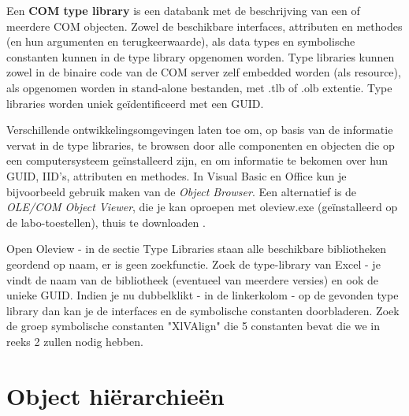 \documentclass[11pt,a4paper]{report}
\begin{document}
Een \textbf{COM type library} is een databank met de beschrijving van een of meerdere COM objecten. Zowel de beschikbare interfaces, attributen en methodes (en hun argumenten en terugkeerwaarde), als data types en symbolische constanten kunnen in de type library opgenomen worden. Type libraries kunnen zowel in de binaire code van de COM server zelf embedded worden (als resource), als opgenomen worden in stand-alone bestanden, met .tlb of .olb extentie. Type libraries worden uniek geïdentificeerd met een GUID.
\par Verschillende ontwikkelingsomgevingen laten toe om, op basis van de informatie vervat in de type libraries, te browsen door alle componenten en objecten die op een computersysteem geïnstalleerd zijn, en om informatie te bekomen over hun GUID, IID's, attributen en methodes. In Visual Basic en Office kun je bijvoorbeeld gebruik maken van de \textit{Object Browser}. Een alternatief is de \textit{OLE/COM Object Viewer}, die je kan oproepen met oleview.exe (geïnstalleerd op de labo-toestellen), thuis te downloaden .

\par Open Oleview - in de sectie Type Libraries staan alle beschikbare bibliotheken geordend op naam, er is geen zoekfunctie. Zoek de type-library van Excel - je vindt de naam van de bibliotheek (eventueel van meerdere versies) en ook de unieke GUID. Indien je nu dubbelklikt - in de linkerkolom - op de gevonden type library dan kan je de interfaces en de symbolische constanten doorbladeren. Zoek de groep symbolische constanten "XlVAlign" die 5 constanten bevat die we in reeks 2 zullen nodig hebben.

\section{Object hiërarchieën}
\end{document}
